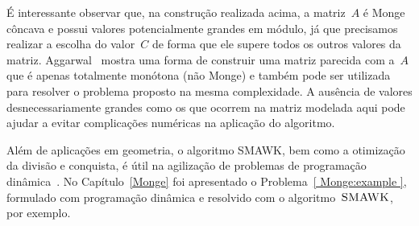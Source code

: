É interessante observar que, na construção realizada acima, a matriz~$A$ é Monge côncava e possui valores potencialmente grandes em módulo, já que precisamos realizar a escolha do valor~$C$ de forma que ele supere todos os outros valores da matriz. Aggarwal~\cite{Aggarwal:1987} mostra uma forma de construir uma matriz parecida com a~$A$ que é apenas totalmente monótona (não Monge) e também pode ser utilizada para resolver o problema proposto na mesma complexidade. A ausência de valores desnecessariamente grandes como os que ocorrem na matriz modelada aqui pode ajudar a evitar complicações numéricas na aplicação do algoritmo.

Além de aplicações em geometria, o algoritmo SMAWK, bem como a otimização da divisão e conquista, é útil na agilização de problemas de programação dinâmica~\cite{Galil:1989,Galil:1992}. No Capítulo~\ref{Monge} foi apresentado o Problema~\ref{ Monge:example }, formulado com programação dinâmica e resolvido com o algoritmo~$\textsc{SMAWK}$, por exemplo.
